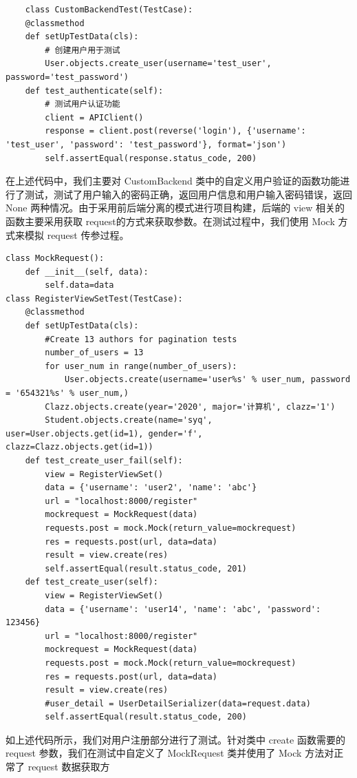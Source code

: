 \documentclass[UTF8,a4paper,10pt]{ctexart}
\begin{document}
\begin{enumerate}
\begin{lstlisting}
    class CustomBackendTest(TestCase):
    @classmethod
    def setUpTestData(cls):
        # 创建用户用于测试
        User.objects.create_user(username='test_user', password='test_password')
    def test_authenticate(self):
        # 测试用户认证功能
        client = APIClient()
        response = client.post(reverse('login'), {'username': 'test_user', 'password': 'test_password'}, format='json')
        self.assertEqual(response.status_code, 200)
\end{lstlisting}
\par\hspace{2em} 在上述代码中，我们主要对 CustomBackend 类中的自定义用户验证的函数功能进行了测试，测试了用户输入的密码正确，返回用户信息和用户输入密码错误，返回 None 两种情况。由于采用前后端分离的模式进行项目构建，后端的 view 相关的函数主要采用获取 request的方式来获取参数。在测试过程中，我们使用 Mock 方式来模拟 request 传参过程。
\begin{lstlisting}
class MockRequest():
    def __init__(self, data):
        self.data=data
class RegisterViewSetTest(TestCase):
    @classmethod
    def setUpTestData(cls):
        #Create 13 authors for pagination tests
        number_of_users = 13
        for user_num in range(number_of_users):
            User.objects.create(username='user%s' % user_num, password = '654321%s' % user_num,)
        Clazz.objects.create(year='2020', major='计算机', clazz='1')
        Student.objects.create(name='syq', user=User.objects.get(id=1), gender='f', clazz=Clazz.objects.get(id=1))
    def test_create_user_fail(self):
        view = RegisterViewSet()
        data = {'username': 'user2', 'name': 'abc'}
        url = "localhost:8000/register"
        mockrequest = MockRequest(data)
        requests.post = mock.Mock(return_value=mockrequest)
        res = requests.post(url, data=data)
        result = view.create(res)
        self.assertEqual(result.status_code, 201)
    def test_create_user(self):
        view = RegisterViewSet()
        data = {'username': 'user14', 'name': 'abc', 'password': 123456}
        url = "localhost:8000/register"
        mockrequest = MockRequest(data)
        requests.post = mock.Mock(return_value=mockrequest)
        res = requests.post(url, data=data)
        result = view.create(res)
        #user_detail = UserDetailSerializer(data=request.data)
        self.assertEqual(result.status_code, 200)
\end{lstlisting}
\par\hspace{2em} 如上述代码所示，我们对用户注册部分进行了测试。针对类中 create 函数需要的 request 参数，我们在测试中自定义了 MockRequest 类并使用了 Mock 方法对正常了 request 数据获取方

\end{enumerate}
\end{document}

